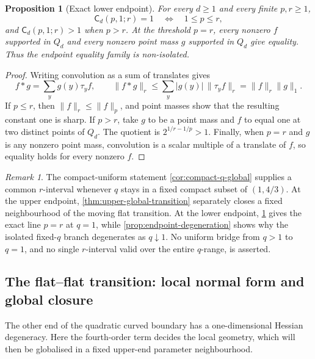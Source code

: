 \documentclass[11pt,reqno]{amsart}
\numberwithin{equation}{section}
\newtheorem{proposition}[proposition]{Proposition}
\theoremstyle{definition}
\theoremstyle{remark}
\newtheorem{remark}[remark]{Remark}
\newcommand{\Cpqr}{\mathsf C}
\begin{document}
\begin{proposition}[Exact lower endpoint]
\label{prop:lower-endpoint-exact}
For every $d\ge1$ and every finite $p,r\ge1$,
\begin{equation}\label{eq:lower-endpoint-threshold}
  \Cpqr_d(p,1;r)=1
  \quad\Longleftrightarrow\quad
  1\le p\le r,
\end{equation}
and $\Cpqr_d(p,1;r)>1$ when $p>r$.  At the threshold $p=r$, every
nonzero $f$ supported in $Q_d$ and every nonzero point mass $g$ supported in
$Q_d$ give equality.  Thus the endpoint equality family is non-isolated.
\end{proposition}

\begin{proof}
Writing convolution as a sum of translates gives
\[
  f*g=\sum_y g(y)\tau_yf,
  \qquad
  \|f*g\|_r\le\sum_y|g(y)|\,\|\tau_yf\|_r
  =\|f\|_r\|g\|_1.
\]
If $p\le r$, then $\|f\|_r\le\|f\|_p$, and point masses show that the
resulting constant one is sharp.  If $p>r$, take $g$ to be a point mass and
$f$ to equal one at two distinct points of $Q_d$.  The quotient is
$2^{1/r-1/p}>1$.  Finally, when $p=r$ and $g$ is any nonzero point mass,
convolution is a scalar multiple of a translate of $f$, so equality holds for
every nonzero $f$.
\end{proof}

\begin{remark}\label{rem:fixed-q-nonuniform}
The compact-uniform statement \cref{cor:compact-q-global} supplies a common
$r$-interval whenever $q$ stays in a fixed compact subset of $(1,4/3)$.
At the upper endpoint, \cref{thm:upper-global-transition} separately closes a
fixed neighbourhood of the moving flat transition.  At the lower endpoint,
\cref{prop:lower-endpoint-exact} gives the exact line $p=r$ at $q=1$, while
\cref{prop:endpoint-degeneration} shows why the isolated fixed-$q$ branch
degenerates as $q\downarrow1$.  No uniform bridge from $q>1$ to $q=1$, and no
single $r$-interval valid over the entire $q$-range, is asserted.
\end{remark}

\subsection{The flat--flat transition: local normal form and global closure}

The other end of the quadratic curved boundary has a one-dimensional Hessian
degeneracy.  Here the fourth-order term decides the local geometry, which will
then be globalised in a fixed upper-end parameter neighbourhood.
\end{document}
